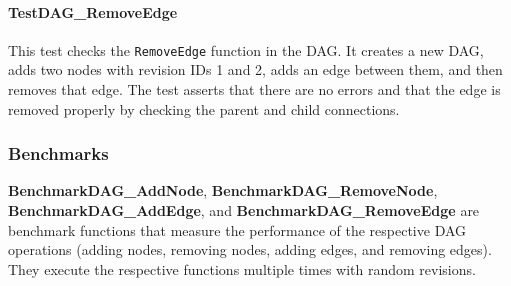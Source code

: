\paragraph{TestDAG\_RemoveEdge}
This test checks the \lstinline{RemoveEdge} function in the DAG. It creates a new DAG, adds two nodes with revision IDs 1 and 2, adds an edge between them, and then removes that edge. The test asserts that there are no errors and that the edge is removed properly by checking the parent and child connections.

\subsubsection{Benchmarks}


\textbf{BenchmarkDAG\_AddNode}, \textbf{BenchmarkDAG\_RemoveNode},\\\textbf{BenchmarkDAG\_AddEdge}, and \textbf{BenchmarkDAG\_RemoveEdge} are benchmark functions that measure the performance of the respective DAG operations (adding nodes, removing nodes, adding edges, and removing edges). They execute the respective functions multiple times with random revisions.




